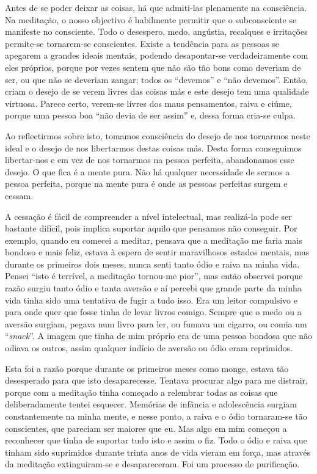 Antes de se poder deixar as coisas, há que admiti-las plenamente na consciência.
Na meditação, o nosso objectivo é habilmente permitir que o subconsciente se
manifeste no consciente. Todo o desespero, medo, angústia, recalques e
irritações permite-se tornarem-se conscientes. Existe a tendência para as
pessoas se apegarem a grandes ideais mentais, podendo desapontar-se
verdadeiramente com eles próprios, porque por vezes sentem que não são tão bons
como deveriam de ser, ou que não se deveriam zangar; todos os “devemos” e “não
devemos”. Então, criam o desejo de se verem livres das coisas más e este desejo
tem uma qualidade virtuosa. Parece certo, verem-se livres dos maus pensamentos,
raiva e ciúme, porque uma pessoa boa “não devia de ser assim” e, dessa forma
cria-se culpa.

Ao reflectirmos sobre isto, tomamos consciência do desejo de nos tornarmos neste
ideal e o desejo de nos libertarmos destas coisas más. Desta forma conseguimos
libertar-nos e em vez de nos tornarmos na pessoa perfeita, abandonamos esse
desejo. O que fica é a mente pura. Não há qualquer necessidade de sermos a
pessoa perfeita, porque na mente pura é onde as pessoas perfeitas surgem e
cessam.

A cessação é fácil de compreender a nível intelectual, mas realizá-la pode ser
bastante difícil, pois implica suportar aquilo que pensamos não conseguir. Por
exemplo, quando eu comecei a meditar, pensava que a meditação me faria mais
bondoso e mais feliz, estava à espera de sentir maravilhosos estados mentais,
mas durante os primeiros dois meses, nunca senti tanto ódio e raiva na minha
vida. Pensei “isto é terrível, a meditação tornou-me pior”, mas então observei
porque razão surgiu tanto ódio e tanta aversão e aí percebi que grande parte da
minha vida tinha sido uma tentativa de fugir a tudo isso. Era um leitor
compulsivo e para onde quer que fosse tinha de levar livros comigo. Sempre que o
medo ou a aversão surgiam, pegava num livro para ler, ou fumava um cigarro, ou
comia um “\emph{snack}”. A imagem que tinha de mim próprio era de uma pessoa
bondosa que não odiava os outros, assim qualquer indício de aversão ou ódio eram
reprimidos.

Esta foi a razão porque durante os primeiros meses como monge, estava tão
desesperado para que isto desaparecesse. Tentava procurar algo para me distrair,
porque com a meditação tinha começado a relembrar todas as coisas que
deliberadamente tentei esquecer. Memórias de infância e adolescência surgiam
constantemente na minha mente, e nesse ponto, a raiva e o ódio tornaram-se tão
conscientes, que pareciam ser maiores que eu. Mas algo em mim começou a
reconhecer que tinha de suportar tudo isto e assim o fiz. Todo o ódio e raiva
que tinham sido suprimidos durante trinta anos de vida vieram em força, mas
através da meditação extinguiram-se e desapareceram. Foi um processo de
purificação.

